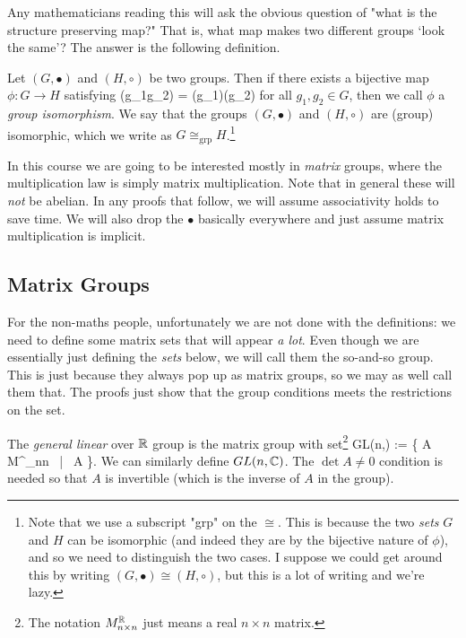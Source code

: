 Any mathematicians reading this will ask the obvious question of "what is the structure preserving map?" That is, what map makes two different groups `look the same'? The answer is the following definition. 

    Let $(G,\bullet)$ and $(H,\circ)$ be two groups. Then if there exists a bijective map $\phi: G \to H$ satisfying 
    \bse 
        \phi(g_1\bullet g_2) = \phi(g_1)\circ \phi(g_2)
    \ese 
    for all $g_1,g_2\in G$, then we call $\phi$ a \textit{group isomorphism}. We say that the groups $(G,\bullet)$ and $(H,\circ)$ are (group) isomorphic, which we write as $G\cong_{\text{grp}} H$.\footnote{Note that we use a subscript "grp" on the $\cong$. This is because the two \textit{sets} $G$ and $H$ can be isomorphic (and indeed they are by the bijective nature of $\phi$), and so we need to distinguish the two cases. I suppose we could get around this by writing $(G,\bullet)\cong(H,\circ)$, but this is a lot of writing and we're lazy.}
\ed 


In this course we are going to be interested mostly in \textit{matrix} groups, where the multiplication law is simply matrix multiplication. Note that in general these will \textit{not} be abelian. In any proofs that follow, we will assume associativity holds to save time. We will also drop the $\bullet$ basically everywhere and just assume matrix multiplication is implicit. 

\subsection{Matrix Groups}

For the non-maths people, unfortunately we are not done with the definitions: we need to define some matrix sets that will appear \textit{a lot}. Even though we are essentially just defining the \textit{sets} below, we will call them the so-and-so group. This is just because they always pop up as matrix groups, so we may as well call them that. The proofs just show that the group conditions meets the restrictions on the set.

    The \textit{general linear} over $\mathbb{R}$ group is the matrix group with set\footnote{The notation $M^{\mathbb{R}}_{n\times n}$ just means a real $n\times n$ matrix.} 
    \bse 
        GL(n,\R) := \big\{ A \in M^{\R}_{n\times n} \, | \, \det A  \big\}.
    \ese 
    We can similarly define $GL(n,\mathbb{C})$. The $\det A \neq 0$ condition is needed so that $A$ is invertible (which is the inverse of $A$ in the group).
\ed 

